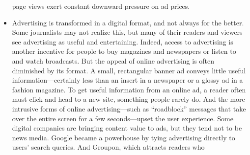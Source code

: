 \begin{itemize}
page views exert constant downward pressure on ad prices.
\item Advertising is transformed in a digital format, and not always for the
better. Some journalists may not realize this, but many of their readers and
viewers see advertising as useful and entertaining. Indeed, access to advertising
is another incentive for people to buy magazines and newspapers or
listen to and watch broadcasts. But the appeal of online advertising is often
diminished by its format. A small, rectangular banner ad conveys little useful
information—certainly less than an insert in a newspaper or a glossy ad
in a fashion magazine. To get useful information from an online ad, a reader
often must click and head to a new site, something people rarely do. And the
more intrusive forms of online advertising—such as ``roadblock'' messages
that take over the entire screen for a few seconds—upset the user experience.
Some digital companies are bringing content value to ads, but they tend
not to be news media. Google became a powerhouse by tying advertising
directly to users’ search queries. And Groupon, which attracts readers who


\end{itemize}
